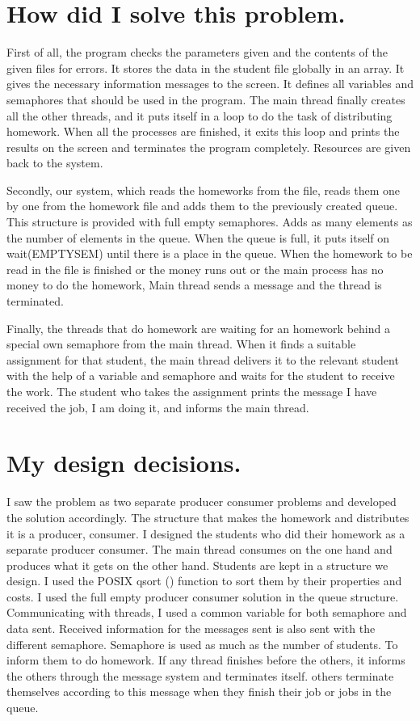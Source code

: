 \documentclass{article}
\begin{document}
\section{How did I solve this problem.}
\quad First of all, the program checks the parameters given and the contents of the given files for errors. It stores the data in the student file globally in an array. It gives the necessary information messages to the screen. It defines all variables and semaphores that should be used in the program. The main thread finally creates all the other threads, and it puts itself in a loop to do the task of distributing homework. When all the processes are finished, it exits this loop and prints the results on the screen and terminates the program completely. Resources are given back to the system.
\par Secondly, our system, which reads the homeworks from the file, reads them one by one from the homework file and adds them to the previously created queue. This structure is provided with full empty semaphores. Adds as many elements as the number of elements in the queue. When the queue is full, it puts itself on wait(EMPTYSEM) until there is a place in the queue. When the homework to be read in the file is finished or the money runs out or the main process has no money to do the homework, Main thread sends a message and the thread is terminated.
\par Finally, the threads that do homework are waiting for an homework behind a special own semaphore from the main thread. When it finds a suitable assignment for that student, the main thread delivers it to the relevant student with the help of a variable and semaphore and waits for the student to receive the work. The student who takes the assignment prints the message I have received the job, I am doing it, and informs the main thread. \\


\section{My design decisions.}
 \quad I saw the problem as two separate producer consumer problems and developed the solution accordingly. The structure that makes the homework and distributes it is a producer, consumer. I designed the students who did their homework as a separate producer consumer. The main thread consumes on the one hand and produces what it gets on the other hand. Students are kept in a structure we design. I used the POSIX qsort () function to sort them by their properties and costs. I used the full empty producer consumer solution in the queue structure. Communicating with threads, I used a common variable for both semaphore and data sent. Received information for the messages sent is also sent with the different semaphore. Semaphore is used as much as the number of students. To inform them to do homework. If any thread finishes before the others, it informs the others through the message system and terminates itself. others terminate themselves according to this message when they finish their job or jobs in the queue.\\
\newpage
\end{document}
